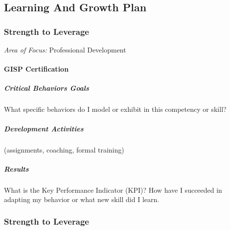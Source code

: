 %
%
%
\def\titlename{Learning And Growth Plan}
\def\authorName{Allegan County GIS Services}
\def\pdfTitle{Learning And Growth Plan}
\def\pdfSubject{Professional Development} %
\def\pdfKeywords{plans}


\subsection{Learning And Growth Plan}
\subsubsection*{Strength to Leverage}

\textit{Area of Focus:} {\Large Professional Development}

\paragraph{GISP Certification}
 
\subparagraph{Critical Behaviors Goals}

What specific behaviors do I model or exhibit in this competency or skill? 
\vspace{.3in}

\subparagraph{Development Activities}

(assignments, coaching, formal training)
\vspace{.3in}

\subparagraph{Results}

What is the Key Performance Indicator (KPI)? How have I succeeded in adapting my behavior or what new skill did I learn.

   
\clearpage









\subsubsection*{Strength to Leverage}


